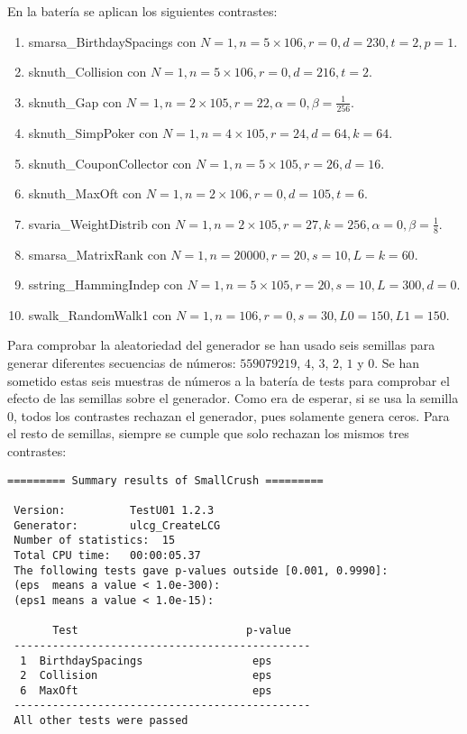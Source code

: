 \documentclass{article}
\begin{document}
En la batería se aplican los siguientes contrastes:

\begin{enumerate}
    \item smarsa\_BirthdaySpacings con $N = 1, n = 5 \times 106, r = 0, d = 230, t = 2, p = 1$.
    \item sknuth\_Collision con $N = 1, n = 5 \times 106, r = 0, d = 216, t = 2$.
    \item sknuth\_Gap con $N = 1, n = 2 \times 105, r = 22, \alpha = 0, \beta = \frac{1}{256}$.
    \item sknuth\_SimpPoker con $N = 1, n = 4 \times 105, r = 24, d = 64, k = 64$.
    \item sknuth\_CouponCollector con $N = 1, n = 5 \times 105, r = 26, d = 16$.
    \item sknuth\_MaxOft con $N = 1, n = 2 \times 106, r = 0, d = 105, t = 6$.
    \item svaria\_WeightDistrib con $N = 1, n = 2 \times 105, r = 27, k = 256, \alpha = 0, \beta= \frac{1}{8}$.
    \item smarsa\_MatrixRank con $N = 1, n = 20000, r = 20, s = 10, L = k = 60$.
    \item sstring\_HammingIndep con $N = 1, n = 5 \times 105, r = 20, s = 10, L = 300, d = 0$.
    \item swalk\_RandomWalk1 con $N = 1, n = 106, r = 0, s = 30, L0 = 150, L1 = 150$.
\end{enumerate}

Para comprobar la aleatoriedad del generador se han usado seis semillas para generar diferentes secuencias de números: $559079219$, $4$, $3$, $2$, $1$ y $0$. 
Se han sometido estas seis muestras de números a la batería de tests para comprobar el efecto de las semillas sobre el generador.
Como era de esperar, si se usa la semilla $0$, todos los contrastes rechazan el generador, pues solamente genera ceros. Para el resto de semillas, siempre se cumple que solo rechazan los mismos tres contrastes:

\begin{lstlisting}
========= Summary results of SmallCrush =========

 Version:          TestU01 1.2.3
 Generator:        ulcg_CreateLCG
 Number of statistics:  15
 Total CPU time:   00:00:05.37
 The following tests gave p-values outside [0.001, 0.9990]:
 (eps  means a value < 1.0e-300):
 (eps1 means a value < 1.0e-15):

       Test                          p-value
 ----------------------------------------------
  1  BirthdaySpacings                 eps  
  2  Collision                        eps  
  6  MaxOft                           eps  
 ----------------------------------------------
 All other tests were passed
\end{lstlisting}
\end{document}

